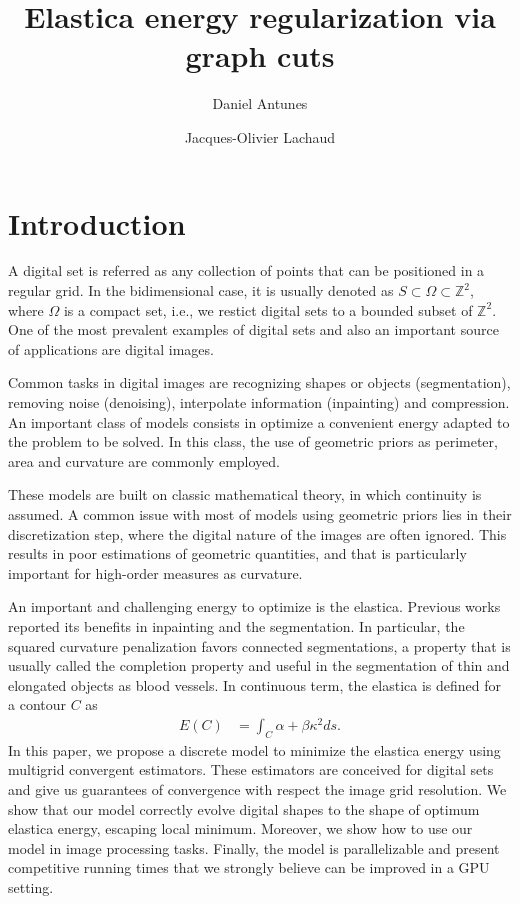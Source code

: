 \documentclass[smallextended]{svjour3}
\begin{document}
%
\title{Elastica energy regularization via graph cuts}
\author{Daniel Antunes%
\and Jacques-Olivier Lachaud}%

\maketitle

\section{Introduction}

A digital set is referred as any collection of points that can be positioned in a regular grid. In the bidimensional case, it is usually denoted as $S \subset \Omega \subset \mathbb{Z}^2$, where $\Omega$ is a compact set, i.e., we restict digital sets to a bounded subset of $\mathbb{Z}^2$. One of the most prevalent examples of digital sets and also an important source of applications are digital images.

Common tasks in digital images are recognizing shapes or objects (segmentation), removing noise (denoising), interpolate information (inpainting) and compression. An important class of models consists in optimize a convenient energy adapted to the problem to be solved. In this class, the use of geometric priors as perimeter, area and curvature are commonly employed.

These models are built on classic mathematical theory, in which continuity is assumed. A common issue with most of models using geometric priors lies in their discretization step, where the digital nature of the images are often ignored. This results in poor estimations of geometric quantities, and that is particularly important for high-order measures as curvature.

An important and challenging energy to optimize is the elastica. Previous works reported its benefits in inpainting and the segmentation. In particular, the squared curvature penalization favors connected segmentations, a property that is usually called the completion property and useful in the segmentation of thin and elongated objects as blood vessels. In continuous term, the elastica is defined for a contour $C$ as
%
\begin{align*}
	E(C) &= \int_{C}{\alpha + \beta \kappa^2 ds}.
\end{align*}
%
In this paper, we propose a discrete model to minimize the elastica energy using multigrid convergent estimators. These estimators are conceived for digital sets and give us guarantees of convergence with respect the image grid resolution. We show that our model correctly evolve digital shapes to the shape of optimum elastica energy, escaping local minimum. Moreover, we show how to use our model in image processing tasks. Finally, the model is parallelizable and present competitive running times that we strongly believe can be improved in a GPU setting.
\end{document}
